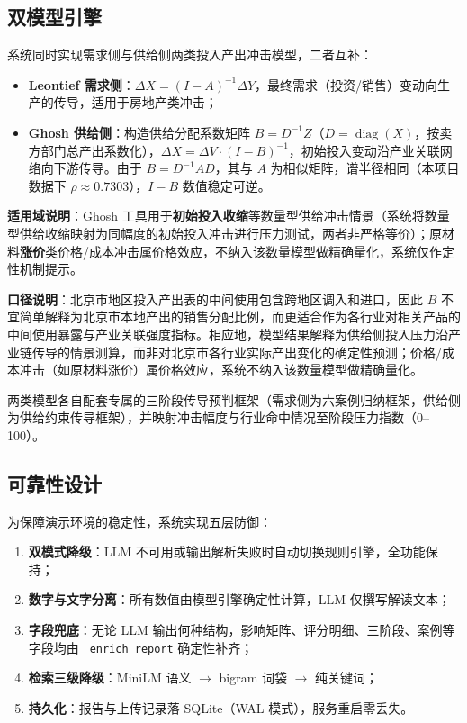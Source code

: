 \documentclass[12pt, a4paper]{ctexart}
\begin{document}
\subsection{双模型引擎}

系统同时实现需求侧与供给侧两类投入产出冲击模型，二者互补：

\begin{itemize}[nosep]
  \item \textbf{Leontief 需求侧}：$\Delta X = (I-A)^{-1}\Delta Y$，最终需求（投资/销售）变动向生产的传导，适用于房地产类冲击；
  \item \textbf{Ghosh 供给侧}：构造供给分配系数矩阵 $B = D^{-1}Z$（$D=\operatorname{diag}(X)$，按卖方部门总产出系数化），$\Delta X = \Delta V \cdot (I-B)^{-1}$，初始投入变动沿产业关联网络向下游传导。由于 $B = D^{-1}AD$，其与 $A$ 为相似矩阵，谱半径相同（本项目数据下 $\rho \approx 0.7303$），$I-B$ 数值稳定可逆。
\end{itemize}

\textbf{适用域说明}：Ghosh 工具用于\textbf{初始投入收缩}等数量型供给冲击情景（系统将数量型供给收缩映射为同幅度的初始投入冲击进行压力测试，两者非严格等价）；原材料\textbf{涨价}类价格/成本冲击属价格效应，不纳入该数量模型做精确量化，系统仅作定性机制提示。

\textbf{口径说明}：北京市地区投入产出表的中间使用包含跨地区调入和进口，因此 $B$ 不宜简单解释为北京市本地产出的销售分配比例，而更适合作为各行业对相关产品的中间使用暴露与产业关联强度指标。相应地，模型结果解释为供给侧投入压力沿产业链传导的情景测算，而非对北京市各行业实际产出变化的确定性预测；价格/成本冲击（如原材料涨价）属价格效应，系统不纳入该数量模型做精确量化。

两类模型各自配套专属的三阶段传导预判框架（需求侧为六案例归纳框架，供给侧为供给约束传导框架），并映射冲击幅度与行业命中情况至阶段压力指数（0--100）。

\subsection{可靠性设计}

为保障演示环境的稳定性，系统实现五层防御：

\begin{enumerate}[nosep]
  \item \textbf{双模式降级}：LLM 不可用或输出解析失败时自动切换规则引擎，全功能保持；
  \item \textbf{数字与文字分离}：所有数值由模型引擎确定性计算，LLM 仅撰写解读文本；
  \item \textbf{字段兜底}：无论 LLM 输出何种结构，影响矩阵、评分明细、三阶段、案例等字段均由 \texttt{\_enrich\_report} 确定性补齐；
  \item \textbf{检索三级降级}：MiniLM 语义 $\to$ bigram 词袋 $\to$ 纯关键词；
  \item \textbf{持久化}：报告与上传记录落 SQLite（WAL 模式），服务重启零丢失。
\end{enumerate}
\end{document}
